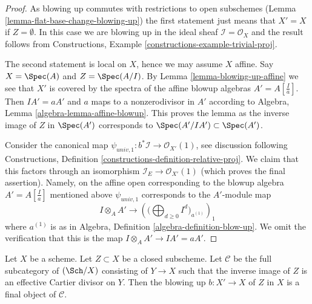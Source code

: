 \begin{proof}
As blowing up commutes with restrictions to open subschemes
(Lemma \ref{lemma-flat-base-change-blowing-up}) the first statement
just means that $X' = X$ if $Z = \emptyset$. In this case we are blowing
up in the ideal sheaf $\mathcal{I} = \mathcal{O}_X$ and the result follows from
Constructions, Example \ref{constructions-example-trivial-proj}.

\medskip\noindent
The second statement is local on $X$, hence we may assume $X$ affine.
Say $X = \Spec(A)$ and $Z = \Spec(A/I)$. By Lemma \ref{lemma-blowing-up-affine}
we see that $X'$ is covered by the spectra of the affine blowup algebras
$A' = A[\frac{I}{a}]$. Then $IA' = aA'$ and $a$ maps to a nonzerodivisor
in $A'$ according to Algebra, Lemma \ref{algebra-lemma-affine-blowup}.
This proves the lemma as the inverse image of $Z$ in $\Spec(A')$
corresponds to $\Spec(A'/IA') \subset \Spec(A')$.

\medskip\noindent
Consider the canonical map
$\psi_{univ, 1} : b^*\mathcal{I} \to \mathcal{O}_{X'}(1)$, see
discussion following Constructions, Definition
\ref{constructions-definition-relative-proj}.
We claim that this factors through an isomorphism
$\mathcal{I}_E \to \mathcal{O}_{X'}(1)$ (which proves the final assertion).
Namely, on the affine open corresponding to the blowup algebra
$A' = A[\frac{I}{a}]$ mentioned above $\psi_{univ, 1}$ corresponds to
the $A'$-module map
$$
I \otimes_A A'
\longrightarrow
\left(\Big(\bigoplus\nolimits_{d \geq 0} I^d\Big)_{a^{(1)}}\right)_1
$$
where $a^{(1)}$ is as in Algebra, Definition \ref{algebra-definition-blow-up}.
We omit the verification that this is the map
$I \otimes_A A' \to IA' = aA'$.
\end{proof}

\begin{lemma}
\label{lemma-universal-property-blowing-up}
Let $X$ be a scheme. Let $Z \subset X$ be a closed subscheme.
Let $\mathcal{C}$ be the full subcategory of $(\Sch/X)$ consisting
of $Y \to X$ such that the inverse image of $Z$ is an effective
Cartier divisor on $Y$. Then the blowing up $b : X' \to X$ of $Z$ in $X$
is a final object of $\mathcal{C}$.
\end{lemma}

